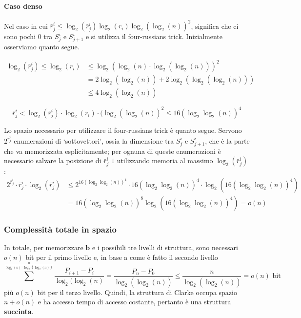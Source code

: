 \paragraph{Caso denso}
Nel caso in cui $\bar{r}^i_j \le \log_2(\bar{r}^i_j) \log_2(r_i) \log_2(\log_2(n))^2$,
significa che ci sono pochi $0$ tra $S^i_j$ e $S^i_{j+1}$ e
si utilizza il four-russians trick. Inizialmente osserviamo quanto segue.
\begin{oss}
	\begin{align*}
		\log_2(\bar{r}^i_j) \leq \log_2(r_i) & \leq \log_2(\log_2(n)\cdot \log_2(\log_2(n)))^2     \\
		                                     & = 2 \log_2(\log_2(n)) + 2 \log_2(\log_2(\log_2(n))) \\
		                                     & \leq 4 \log_2(\log_2(n))
	\end{align*}
\end{oss}
\begin{oss}
	$$
		\bar{r}^i_j < \log_2(\bar{r}^i_j) \cdot \log_2(r_i) \cdot (\log_2(\log_2(n))^2
		\leq 16(\log_2\log_2(n))^4
	$$
\end{oss}
Lo spazio necessario per utilizzare il four-russians trick è quanto segue.
Servono $2^{\bar{r}^i_j}$ enumerazioni di `sottovettori',
ossia la dimensione tra $S^i_j$ e $S^i_{j+1}$,
che è la parte che va memorizzata esplicitamente; per ognuna di queste
enumerazioni è necessario salvare la posizione di $\bar{r}^i_j$ $1$ utilizzando
memoria al massimo $\log_2(\bar{r}^i_j)$:
\begin{align*}
	2^{\bar{r}^i_j} \cdot \bar{r}^i_j \cdot \log_2(\bar{r}^i_j) & \leq
	2^{16(\log_2\log_2(n))^4} \cdot 16(\log_2\log_2(n))^4 \cdot \log_2(16(\log_2\log_2(n))^4)                                  \\
	                                                            & = 16(\log_2\log_2(n))^8 \log_2(16(\log_2\log_2(n))^4) = o(n)
\end{align*}


\subsubsection{Complessità totale in spazio}
In totale, per memorizzare $\mathbf{b}$ e i possibili tre livelli di struttura,
sono necessari $o(n)$ bit per il primo livello e, in base a come è fatto il secondo livello
$$
	\sum^{\frac{n}{\log_2(n)\cdot \log_2(\log_2(n))}} \frac{P_{i+1} - P_i}{\log_2(\log_2(n)}
	= \frac{P_n - P_0}{\log_2(\log_2(n))}
	\leq \frac{n}{\log_2(\log_2(n))} = o(n) \text{ bit}
$$
più $o(n)$ bit per il terzo livello. Quindi, la struttura di Clarke occupa
spazio $n + o(n)$ e ha accesso tempo di accesso costante, pertanto è
una struttura \textbf{succinta}.

